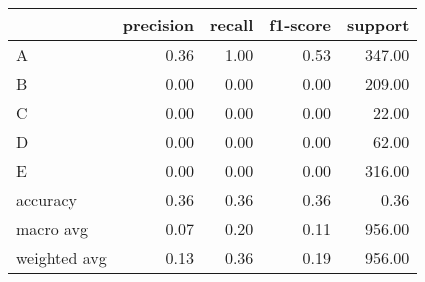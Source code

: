 \begin{tabular}{|l|r|r|r|r|}
\hline
{} &  precision &  recall &  f1-score &  support \\
\hline
A            &       0.36 &    1.00 &      0.53 &   347.00 \\
B            &       0.00 &    0.00 &      0.00 &   209.00 \\
C            &       0.00 &    0.00 &      0.00 &    22.00 \\
D            &       0.00 &    0.00 &      0.00 &    62.00 \\
E            &       0.00 &    0.00 &      0.00 &   316.00 \\
accuracy     &       0.36 &    0.36 &      0.36 &     0.36 \\
macro avg    &       0.07 &    0.20 &      0.11 &   956.00 \\
weighted avg &       0.13 &    0.36 &      0.19 &   956.00 \\
\hline
\end{tabular}
